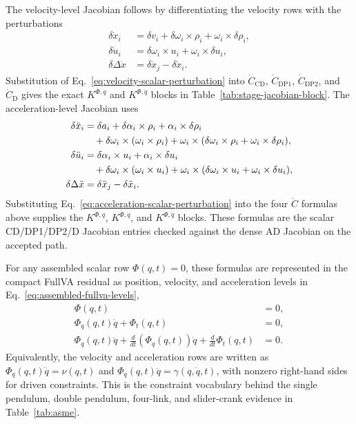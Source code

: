 \documentclass[preprint,12pt]{elsarticle}
\begin{document}
The velocity-level Jacobian follows by differentiating the velocity rows with
the perturbations
\begin{align}
  \delta\dot x_i
    &= \delta v_i+\delta\omega_i\times\rho_i
       +\omega_i\times\delta\rho_i,\\
  \delta\dot u_i
    &= \delta\omega_i\times u_i+\omega_i\times\delta u_i,\\
  \delta\Delta\dot x
    &= \delta\dot x_j-\delta\dot x_i .
  \label{eq:velocity-scalar-perturbation}
\end{align}
Substitution of Eq.~\eqref{eq:velocity-scalar-perturbation} into
$\dot C_{\mathrm{CD}}$, $\dot C_{\mathrm{DP1}}$,
$\dot C_{\mathrm{DP2}}$, and $\dot C_{\mathrm{D}}$ gives the exact
$K^{\dot\Phi,q}$ and $K^{\dot\Phi,\dot q}$ blocks in
Table~\ref{tab:stage-jacobian-block}. The acceleration-level Jacobian uses
\begin{align}
  \delta\ddot x_i
    &= \delta a_i+\delta\alpha_i\times\rho_i
       +\alpha_i\times\delta\rho_i \notag\\
    &\quad+\delta\omega_i\times(\omega_i\times\rho_i)
       +\omega_i\times(\delta\omega_i\times\rho_i
       +\omega_i\times\delta\rho_i),\\
  \delta\ddot u_i
    &= \delta\alpha_i\times u_i+\alpha_i\times\delta u_i \notag\\
    &\quad+\delta\omega_i\times(\omega_i\times u_i)
       +\omega_i\times(\delta\omega_i\times u_i
       +\omega_i\times\delta u_i),\\
  \delta\Delta\ddot x
    &= \delta\ddot x_j-\delta\ddot x_i .
  \label{eq:acceleration-scalar-perturbation}
\end{align}
Substituting Eq.~\eqref{eq:acceleration-scalar-perturbation} into the four
$\ddot C$ formulas above supplies the $K^{\ddot\Phi,q}$,
$K^{\ddot\Phi,\dot q}$, and $K^{\ddot\Phi,\ddot q}$ blocks. These formulas
are the scalar CD/DP1/DP2/D Jacobian entries checked against the dense AD
Jacobian on the accepted path.

For any assembled scalar row $\Phi(q,t)=0$, these formulas are represented
in the compact FullVA residual as position, velocity, and acceleration
levels in Eq.~\eqref{eq:assembled-fullva-levels},
\begin{equation}
\label{eq:assembled-fullva-levels}
\begin{aligned}
  \Phi(q,t)&=0,\\
  \Phi_q(q,t)\dot q+\Phi_t(q,t)&=0,\\
  \Phi_q(q,t)\ddot q+
  \frac{d}{dt}\left(\Phi_q(q,t)\right)\dot q+
  \frac{d}{dt}\Phi_t(q,t)&=0.
\end{aligned}
\end{equation}
Equivalently, the velocity and acceleration rows are written as
$\Phi_q(q,t)\dot q=\nu(q,t)$ and
$\Phi_q(q,t)\ddot q=\gamma(q,\dot q,t)$, with nonzero right-hand sides for
driven constraints. This is the constraint vocabulary behind the single
pendulum, double pendulum, four-link, and slider-crank evidence in
Table~\ref{tab:asme}.
\end{document}
